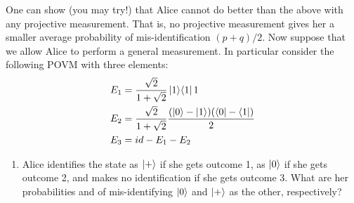\documentclass[12pt]{article}
\begin{document}
\begin{enumerate}
\begin{enumerate}
%
\end{enumerate}
One can show (you may try!) that Alice cannot do better than the above with any projective measurement. That is, no projective measurement gives her a smaller average probability of mis-identification $(p+q)/2$. Now suppose that we allow Alice to perform a general measurement. In particular consider the following POVM with three elements:
\begin{align*}
E_1 &= \frac{\sqrt{2}}{1+\sqrt{2}} \ket{1}\!\bra{1}{1} \\
E_2 &= \frac{\sqrt{2}}{1+\sqrt{2}} \frac{(\ket{0}-\ket{1})(\bra{0}-\bra{1})}{2} \\
E_3 &= id - E_1 - E_2
\end{align*}
\begin{enumerate}
\item Alice identifies the state as $\ket{+}$ if she gets outcome 1, as $\ket{0}$ if she gets outcome 2, and makes no identification if she gets outcome 3. What are her probabilities and of mis-identifying $\ket{0}$ and $\ket{+}$ as the other, respectively?
%
\end{enumerate}
\end{enumerate}
\end{document}
